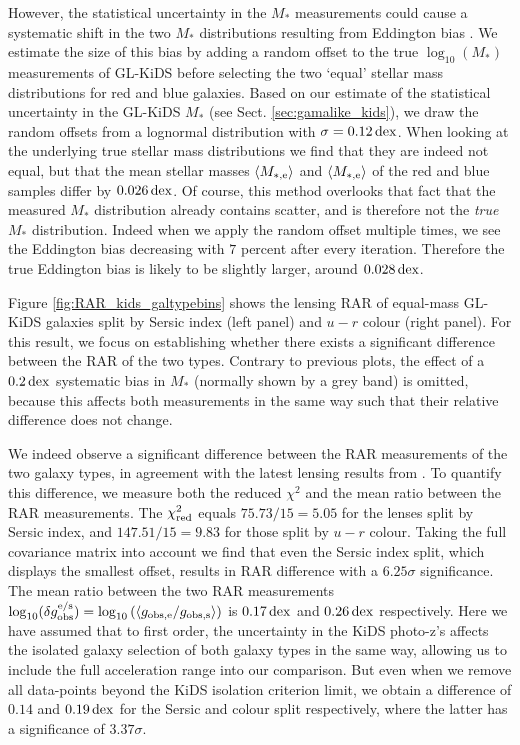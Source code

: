 \documentclass[usenatbib]{mnras}
\newcommand{\lan}{\langle}
\newcommand{\ran}{\rangle}
\newcommand{\un}[1]{_{\rm #1}}
\newcommand{\dex}{\, {\rm dex}}
\begin{document}
However, the statistical uncertainty in the $M_*$ measurements could cause a systematic shift in the two $M_*$ distributions resulting from Eddington bias \cite[]{eddington1913}. We estimate the size of this bias by adding a random offset to the true $\log_{10}(M_*)$ measurements of GL-KiDS before selecting the two `equal' stellar mass distributions for red and blue galaxies. Based on our estimate of the statistical uncertainty in the GL-KiDS $M_*$ (see Sect. \ref{sec:gamalike_kids}), we draw the random offsets from a lognormal distribution with $\sigma = 0.12 \dex$. When looking at the underlying true stellar mass distributions we find that they are indeed not equal, but that the mean stellar masses $\lan M\un{*,e} \ran$ and $\lan M\un{*,e} \ran$ of the red and blue samples differ by $0.026 \dex$. Of course, this method overlooks that fact that the measured $M_*$ distribution already contains scatter, and is therefore not the \emph{true} $M_*$ distribution. Indeed when we apply the random offset multiple times, we see the Eddington bias decreasing with $7$ percent after every iteration. Therefore the true Eddington bias is likely to be slightly larger, around $0.028 \dex$.

Figure \ref{fig:RAR_kids_galtypebins} shows the lensing RAR of equal-mass GL-KiDS galaxies split by Sersic index (left panel) and $u-r$ colour (right panel). For this result, we focus on establishing whether there exists a significant difference between the RAR of the two types. Contrary to previous plots, the effect of a $0.2 \dex$ systematic bias in $M_*$ (normally shown by a grey band) is omitted, because this affects both measurements in the same way such that their relative difference does not change.

We indeed observe a significant difference between the RAR measurements of the two galaxy types, in agreement with the latest lensing results from \cite{taylor2020}. To quantify this difference, we measure both the reduced $\chi^2$ and the mean ratio between the RAR measurements. The $\chi\un{red}^2$ equals $75.73 / 15 = 5.05$ for the lenses split by Sersic index, and $147.51 / 15 = 9.83$ for those split by $u-r$ colour. Taking the full covariance matrix into account we find that even the Sersic index split, which displays the smallest offset, results in RAR difference with a $6.25 \sigma$ significance. The mean ratio between the two RAR measurements $\log_{10}(\delta g\un{obs}^{\rm e/s}) = \log_{10}\left( \langle g\un{obs,e} / g\un{obs,s}\rangle \right)$ is $0.17 \dex$ and $0.26 \dex$ respectively. Here we have assumed that to first order, the uncertainty in the KiDS photo-z's affects the isolated galaxy selection of both galaxy types in the same way, allowing us to include the full acceleration range into our comparison. But even when we remove all data-points beyond the KiDS isolation criterion limit, we obtain a difference of $0.14$ and $0.19 \dex$ for the Sersic and colour split respectively, where the latter has a significance of $3.37 \sigma$.
\end{document}

